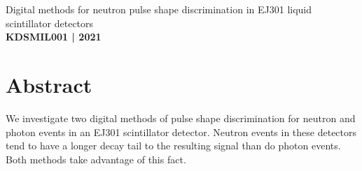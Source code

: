 \documentclass[11pt]{article}
\numberwithin{equation}{section}
\numberwithin{figure}{section}
\numberwithin{table}{section}
\begin{document}
\begin{center}
    {\huge Digital methods for neutron pulse shape discrimination in EJ301 liquid scintillator detectors}\\
    \vspace{0.2in}
    \textbf{KDSMIL001 | 2021}

    \section*{Abstract}\label{sec:Abstract} %
    We investigate two digital methods of pulse shape discrimination for neutron and photon events in an EJ301 scintillator detector. Neutron events in these detectors tend to have a longer decay tail to the resulting signal than do photon events. Both methods take advantage of this fact. 
    
\end{center}
\end{document}
